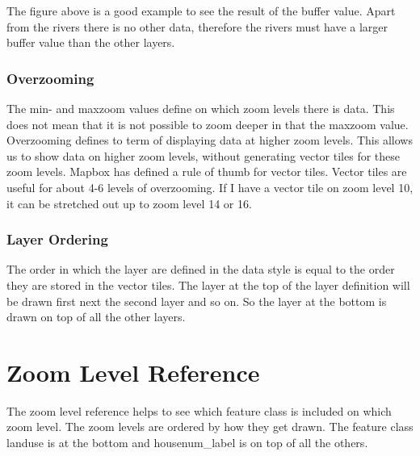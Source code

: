 The figure above is a good example to see the result of the buffer value. Apart from the rivers there is no other data, therefore the rivers must have a larger buffer value than the other layers.

\subsubsection{Overzooming}\label{overzooming}
The min- and maxzoom values define on which zoom levels there is data. This does not mean that it is not possible to zoom deeper in that the maxzoom value.
Overzooming defines to term of displaying data at higher zoom levels.\cite{90_mapbox.com_2015}
This allows us to show data on higher zoom levels, without generating vector tiles for these zoom levels.
Mapbox has defined a rule of thumb for vector tiles. Vector tiles are useful for about 4-6 levels of overzooming. If I have a vector tile on zoom level 10, it can be stretched out up to zoom level 14 or 16.  

\subsubsection{Layer Ordering}\label{layer_ordering}
The order in which the layer are defined in the data style is equal to the order they are stored in the vector tiles.
The layer at the top of the layer definition will be drawn first next the second layer and so on. So the layer at the bottom is drawn on top of all the other layers.


\section{Zoom Level Reference}\label{zoomlevel_reference}
The zoom level reference helps to see which feature class is included on which zoom level. The zoom levels are ordered by how they get drawn. The feature class landuse is at the bottom and housenum\_label is on top of all the others. 

